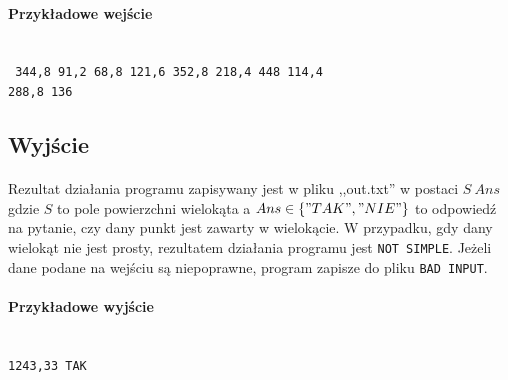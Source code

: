 \documentclass{article}
\begin{document}
\paragraph{Przykładowe wejście} \mbox{}\\
\texttt{
344,8 91,2 68,8 121,6 352,8 218,4 448 114,4\\
288,8 136
}

\subsection{Wyjście}

\paragraph{}
Rezultat działania programu zapisywany jest w pliku ,,out.txt'' w postaci \(S\ Ans\) gdzie \(S\) to pole powierzchni wielokąta a \(Ans\in\{"TAK","NIE"\}\) to odpowiedź na pytanie, czy dany punkt jest zawarty w wielokącie. W przypadku, gdy dany wielokąt nie jest prosty, rezultatem działania programu jest \texttt{NOT SIMPLE}. Jeżeli dane podane na wejściu są niepoprawne, program zapisze do pliku \texttt{BAD INPUT}.

\paragraph{Przykładowe wyjście} \mbox{}\\
\texttt{1243,33 TAK}
\end{document}
